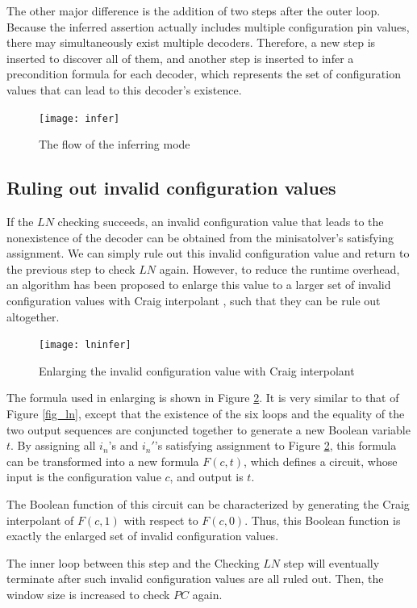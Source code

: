 \documentclass[runningheads,a4paper]{llncs}
\begin{document}
The other major difference is the addition of two steps after the outer loop.
Because the inferred assertion actually includes multiple configuration pin values,
there may simultaneously exist multiple decoders.
Therefore,
a new step is inserted to discover all of them,
and another step is inserted to infer a precondition formula for each decoder,
which represents the set of configuration values that can lead to this decoder's existence.

\begin{figure}[t]
\centering
\texttt{[image: infer]}
\caption{The flow of the inferring mode}
\label{fig_infer}
\end{figure}


\subsection{Ruling out invalid configuration values}

If the $LN$ checking succeeds,
an invalid configuration value that leads to the nonexistence of the decoder can be obtained from the  minisatolver's satisfying assignment.
We can simply rule out this invalid configuration value and return to the previous step to check $LN$ again.
However,
to reduce the runtime overhead,
an algorithm has been proposed to enlarge this value to a larger set of invalid configuration values with Craig interpolant ,
such that they can be rule out altogether.
\begin{figure}[t]
\centering
\texttt{[image: lninfer]}
\caption{Enlarging the invalid configuration value with Craig interpolant}
\label{fig_lninfer}
\end{figure}

The formula used in enlarging is shown in Figure \ref{fig_lninfer}.
It is very similar to that of Figure \ref{fig_ln},
except that the existence of the six loops and the equality of the two output sequences are conjuncted together to generate a new Boolean variable $t$.
By assigning all $i_n$'s and $i_n'$'s satisfying assignment to Figure \ref{fig_lninfer},
this formula can be transformed into a new formula $F(c,t)$,
which defines a circuit,
whose input is the configuration value $c$,
and output is $t$.

The Boolean function of this circuit can be characterized by generating the Craig interpolant of $F(c,1)$ with respect to $F(c,0)$.
Thus,
this Boolean function is exactly the enlarged set of invalid configuration values.


The inner loop between this step and the Checking $LN$ step will eventually terminate after such invalid configuration values are all ruled out.
Then,
the window size is increased to check $PC$ again.
\end{document}
